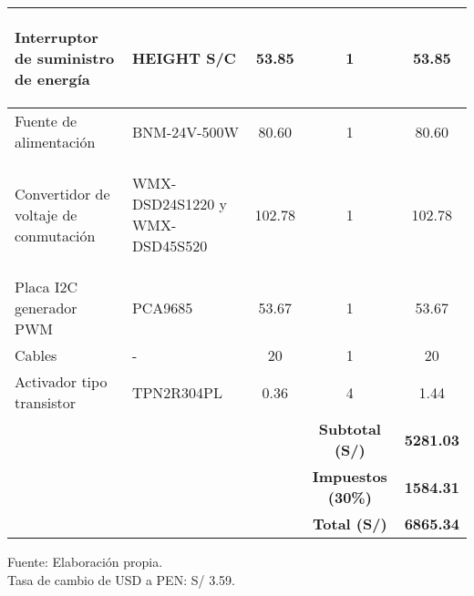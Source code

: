 \begin{table}[H]
\begin{tabular}{llc|c|c|}
		\multicolumn{1}{|l|}{\begin{minipage}{\mythirdmaxsizeofcontenttable}\begin{myflushleftinsidetable}
					Interruptor de suministro de energía
		\end{myflushleftinsidetable}\end{minipage}}
		&
		\multicolumn{1}{l|}{HEIGHT S/C} & 53.85 & 1 & 53.85 \\ \hline
		\multicolumn{1}{|l|}{Fuente de alimentación}  & \multicolumn{1}{l|}{BNM-24V-500W} & 80.60 & 1 & 80.60 \\ \hline		
		\multicolumn{1}{|l|}{\begin{minipage}{\mythirdmaxsizeofcontenttable}\begin{myflushleftinsidetable}
					Convertidor de voltaje de conmutación
		\end{myflushleftinsidetable}\end{minipage}}
		&
		\multicolumn{1}{l|}{\begin{minipage}{\mythirdmaxsizeofcontenttable}\begin{myflushleftinsidetable}
				WMX-DSD24S1220 y WMX-DSD45S520
		\end{myflushleftinsidetable}\end{minipage}}
		 & 102.78 & 1 & 102.78 \\ \hline
		\multicolumn{1}{|l|}{Placa I2C generador PWM}  & \multicolumn{1}{l|}{PCA9685} & 53.67 & 1 & 53.67 \\ \hline
		\multicolumn{1}{|l|}{Cables} & \multicolumn{1}{l|}{-} & 20 & 1 & 20 \\ \hline
		\multicolumn{1}{|l|}{Activador tipo transistor}  & \multicolumn{1}{l|}{TPN2R304PL} & 0.36 & 4 & 1.44 \\ \hline
		&  &  & \textbf{Subtotal (S/)} & \textbf{5281.03} \\ \cline{4-5} 
		&  &  & \textbf{Impuestos (30\%)} & \textbf{1584.31} \\ \cline{4-5} 
		&  &  & \textbf{Total (S/)} & \textbf{6865.34} \\ \cline{4-5} 
	\end{tabular}
		\begin{myflushcenteraftertable}	
		Fuente: Elaboración propia. \\
		Tasa de cambio de USD a PEN: S/ 3.59.
	\end{myflushcenteraftertable}
\end{table}




